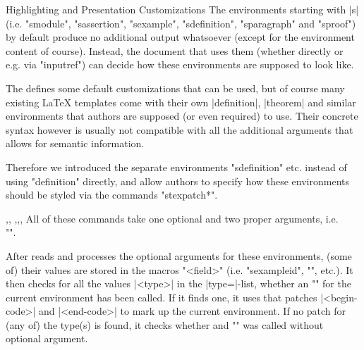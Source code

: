 \begin{sfragment}[id=sec.customhighlight]{Highlighting and Presentation Customizations}
  The environments starting with |s| (i.e. \stexcode"smodule",
  \stexcode"sassertion", \stexcode"sexample", \stexcode"sdefinition",
  \stexcode"sparagraph" and \stexcode"sproof") by default produce
  no additional output whatsoever (except for the environment 
  content of course). Instead, the document that
  uses them (whether directly or e.g. via \stexcode"inputref")
  can decide how these environments are supposed to look like.

  The  defines some default customizations that can
  be used, but of course many existing \LaTeX\xspace templates
  come with their own |definition|, |theorem| and similar environments
  that authors are supposed (or even required) to use. Their
  concrete syntax however is usually not compatible with all the
  additional arguments that \sTeX allows for semantic information.

  Therefore we introduced the separate environments 
  \stexcode"sdefinition" etc.
  instead of using \stexcode"definition" directly, and allow
  authors to specify how these environments should be styled
  via the commands \stexcode"stexpatch*".

  \begin{function}{\stexpatchmodule,\stexpatchdefinition,
    \stexpatchassertion,\stexpatchexample,\stexpatchparagraph,
    \stexpatchproof}
    All of these commands take one optional and two proper arguments,
    i.e. 
    \\\stexcode"".

    After \stex reads and processes the optional arguments for
    these environments, (some of) their values are stored in the macros
    \stexcode"\s*<field>" (i.e. \stexcode"sexampleid",
    \stexcode"\sassertionname", etc.). It then checks
    for all the values |<type>| in the |type=|-list, whether an
    \stexcode"\stexpatch*[<type>]" for the current environment has
    been called. If it finds one, it uses that patches |<begin-code>|
    and |<end-code>| to mark up the current environment. If no patch
    for (any of) the type(s) is found, it checks whether and
    \stexcode"\stexpatch*" was called without optional argument.
  \end{function}


\end{sfragment}

